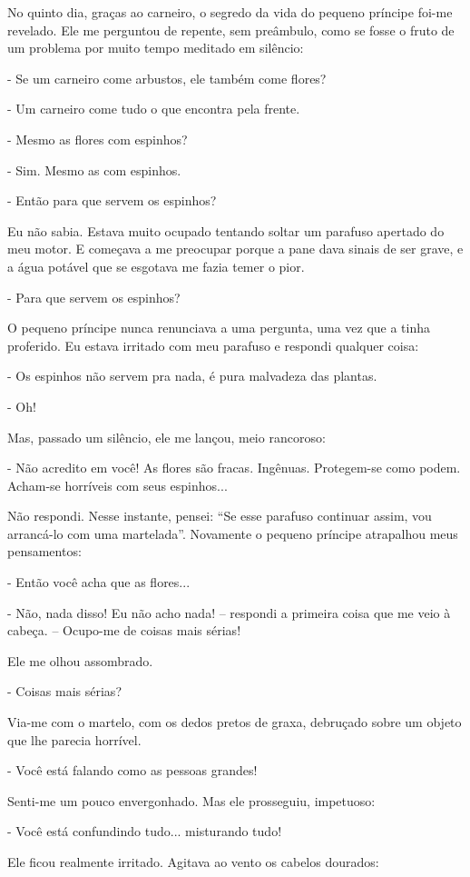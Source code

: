 \begin{Parallel}[p]{}{}
{No quinto dia, graças ao carneiro, o segredo da vida do pequeno príncipe
foi-me revelado. Ele me perguntou de repente, sem preâmbulo, como se
fosse o fruto de um problema por muito tempo meditado em silêncio:

- Se um carneiro come arbustos, ele também come flores?

- Um carneiro come tudo o que encontra pela frente.

- Mesmo as flores com espinhos?

- Sim. Mesmo as com espinhos.

- Então para que servem os espinhos?

Eu não sabia. Estava muito ocupado tentando soltar um parafuso apertado
do meu motor. E começava a me preocupar porque a pane dava sinais de ser
grave, e a água potável que se esgotava me fazia temer o pior.

- Para que servem os espinhos?

O pequeno príncipe nunca renunciava a uma pergunta, uma vez que a tinha
proferido. Eu estava irritado com meu parafuso e respondi qualquer
coisa:

- Os espinhos não servem pra nada, é pura malvadeza das plantas.

- Oh!

Mas, passado um silêncio, ele me lançou, meio rancoroso:

- Não acredito em você! As flores são fracas. Ingênuas. Protegem-se como
podem. Acham-se horríveis com seus espinhos...

Não respondi. Nesse instante, pensei: ``Se esse parafuso continuar
assim, vou arrancá-lo com uma martelada''. Novamente o pequeno príncipe
atrapalhou meus pensamentos:

- Então você acha que as flores...

- Não, nada disso! Eu não acho nada! -- respondi a primeira coisa que me
veio à cabeça. -- Ocupo-me de coisas mais sérias!

Ele me olhou assombrado.

- Coisas mais sérias?

Via-me com o martelo, com os dedos pretos de graxa, debruçado sobre um
objeto que lhe parecia horrível.

- Você está falando como as pessoas grandes!

Senti-me um pouco envergonhado. Mas ele prosseguiu, impetuoso:

- Você está confundindo tudo... misturando tudo!

Ele ficou realmente irritado. Agitava ao vento os cabelos dourados:

}
\end{Parallel}
